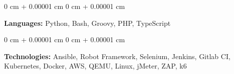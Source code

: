 \documentclass[10pt, a4paper]{article}
\newenvironment{onecolentry}{
    \begin{adjustwidth}{
        0 cm + 0.00001 cm
    }{
        0 cm + 0.00001 cm
    }
}{
    \end{adjustwidth}
} %
\begin{document}
        \begin{onecolentry}
            \textbf{Languages:} Python, Bash, Groovy, PHP, TypeScript
        \end{onecolentry}

        \vspace{0.2 cm}

        \begin{onecolentry}
            \textbf{Technologies:} Ansible, Robot Framework, Selenium, Jenkins, Gitlab CI, Kubernetes, Docker, AWS, QEMU, Linux, jMeter, ZAP, k6
        \end{onecolentry}
\end{document}
